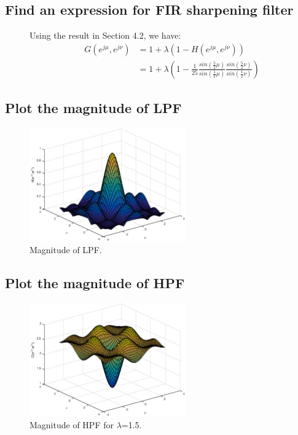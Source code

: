 \documentclass{article}
\begin{document}
\subsection{Find an expression for FIR sharpening filter}
\begin{description}
\item[]
Using the result in Section 4.2, we have:
\begin{align*}
G(e^{j\mu},e^{j\nu}) &= 1+\lambda(1-H(e^{j\mu},e^{j\nu})) \\
					 &= 1+\lambda(1-\frac{1}{25}{\frac{sin(\frac{5}{2}\mu)}{sin(\frac{1}{2}\mu)}}
                     {\frac{sin(\frac{5}{2}\nu)}{sin(\frac{1}{2}\nu)}})
\end{align*}
\end{description}
\pagebreak

\subsection{Plot the magnitude of LPF}
\begin{figure}[h]
\begin{center}
\includegraphics[width=0.6\textwidth]{lpf1csft}
\caption{Magnitude of LPF.}
\end{center}
\end{figure}

\subsection{Plot the magnitude of HPF}
\begin{figure}[h]
\begin{center}
\includegraphics[width=0.6\textwidth]{hpfcsft}
\caption{Magnitude of HPF for $\lambda$=1.5.}
\end{center}
\end{figure}
\end{document}
